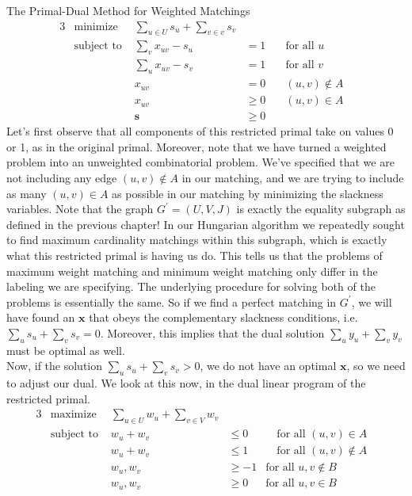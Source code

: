 \begin{section}{The Primal-Dual Method for Weighted Matchings}
\begin{alignat}{3}
		& \text{minimize } & \sum_{u\in U} s_u + \sum_{v\in v} s_v & \\
		& \text{subject to } & \sum_v x_{uv} - s_u & = 1 & \quad \text{for all } u & \\
				     && \sum_u x_{uv} - s_v & = 1 & \quad \text{for all } v & \\
				     && x_{uv} & = 0 & \quad (u,v)\notin A \\
				     && x_{uv} & \geq 0 & \quad (u,v)\in A \\
				     && \mathbf{s} & \geq 0
	\end{alignat}
	Let's first observe that all components of this restricted primal take on values 0 or 1, as 
	in the original primal. Moreover, note that we have turned a weighted problem into an 
	unweighted combinatorial problem. We've specified that we are not including any edge 
	$(u,v)\notin A$ in our matching, and we are trying to include as many $(u,v)\in A$ as possible 
	in our matching by minimizing the slackness variables. Note that the graph $G^{'} = (U,V,J)$ 
	is exactly the equality subgraph as defined in the previous chapter! In our Hungarian algorithm 
	we repeatedly sought to find maximum cardinality matchings within this subgraph, which is 
	exactly what this restricted primal is having us do. This tells us that the problems of maximum 
	weight matching and minimum weight matching only differ in the labeling we are specifying. The 
	underlying procedure for solving both of the problems is essentially the same. So if we find a 
	perfect matching in $G^{'}$, we will have found an $\mathbf{x}$ that obeys the complementary 
	slackness conditions, i.e. $\sum_u s_u + \sum_v s_v = 0$. Moreover, this implies that the 
	dual solution $\sum_u y_u + \sum_v y_v$ must be optimal as well.\\
	Now, if the solution $\sum_u s_u + \sum_v s_v > 0$, we do not have an optimal $\mathbf{x}$, 
	so we need to adjust our dual. We look at this now, in the dual linear program of the 
	restricted primal.
	\begin{alignat}{3}
		& \text{maximize } & \sum_{u\in U} w_u + \sum_{v\in V} w_v & \\
		& \text{subject to } & w_u + w_v & \leq 0 & \quad \text{for all } (u,v)\in A & \\
				     && w_u + w_v & \leq 1 & \quad \text{for all } (u,v)\notin A & \\
				     && w_u,w_v & \geq -1 & \text{for all } u,v\notin B \\
				     && w_u,w_v & \geq 0 & \text{for all } u,v\in B \\

\end{alignat}
\end{section}
